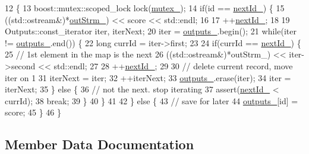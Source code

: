 \begin{DoxyCode}
12                                                \{
13   boost::mutex::scoped\_lock lock(\hyperlink{classmarian_1_1ScoreCollector_a6ed0505c4c459cdaad1b39f86d36f1a4}{mutex\_});
14   \textcolor{keywordflow}{if}(\textcolor{keywordtype}{id} == \hyperlink{classmarian_1_1ScoreCollector_a68bf9186c90c33a7c44d263e58610f3b}{nextId\_}) \{
15     ((std::ostream&)*\hyperlink{classmarian_1_1ScoreCollector_a62fd57793146683d75456f0b18c0966e}{outStrm\_}) << score << std::endl;
16 
17     ++\hyperlink{classmarian_1_1ScoreCollector_a68bf9186c90c33a7c44d263e58610f3b}{nextId\_};
18 
19     Outputs::const\_iterator iter, iterNext;
20     iter = \hyperlink{classmarian_1_1ScoreCollector_afb3b293c00d7e2b48fa65a32ac7461b7}{outputs\_}.begin();
21     \textcolor{keywordflow}{while}(iter != \hyperlink{classmarian_1_1ScoreCollector_afb3b293c00d7e2b48fa65a32ac7461b7}{outputs\_}.end()) \{
22       \textcolor{keywordtype}{long} currId = iter->first;
23 
24       \textcolor{keywordflow}{if}(currId == \hyperlink{classmarian_1_1ScoreCollector_a68bf9186c90c33a7c44d263e58610f3b}{nextId\_}) \{
25         \textcolor{comment}{// 1st element in the map is the next}
26         ((std::ostream&)*outStrm\_) << iter->second << std::endl;
27 
28         ++\hyperlink{classmarian_1_1ScoreCollector_a68bf9186c90c33a7c44d263e58610f3b}{nextId\_};
29 
30         \textcolor{comment}{// delete current record, move iter on 1}
31         iterNext = iter;
32         ++iterNext;
33         \hyperlink{classmarian_1_1ScoreCollector_afb3b293c00d7e2b48fa65a32ac7461b7}{outputs\_}.erase(iter);
34         iter = iterNext;
35       \} \textcolor{keywordflow}{else} \{
36         \textcolor{comment}{// not the next. stop iterating}
37         assert(\hyperlink{classmarian_1_1ScoreCollector_a68bf9186c90c33a7c44d263e58610f3b}{nextId\_} < currId);
38         \textcolor{keywordflow}{break};
39       \}
40     \}
41 
42   \} \textcolor{keywordflow}{else} \{
43     \textcolor{comment}{// save for later}
44     \hyperlink{classmarian_1_1ScoreCollector_afb3b293c00d7e2b48fa65a32ac7461b7}{outputs\_}[id] = score;
45   \}
46 \}
\end{DoxyCode}


\subsection{Member Data Documentation}
